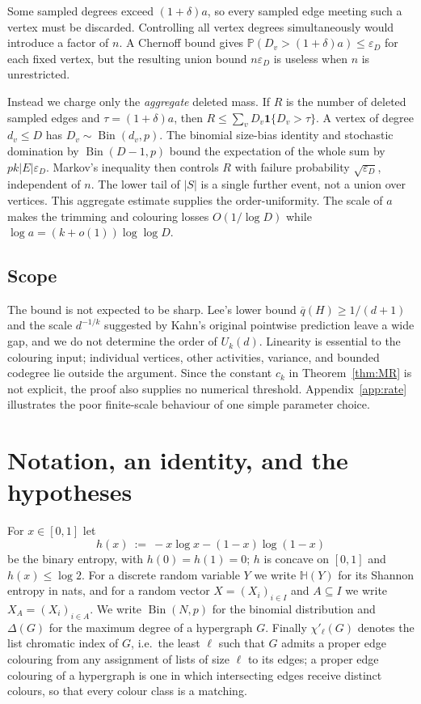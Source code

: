 \documentclass[11pt,a4paper]{amsart}
\theoremstyle{plain}
\theoremstyle{definition}
\theoremstyle{remark}
\newcommand{\EE}{E}
\newcommand{\PP}{\mathbb{P}}
\newcommand{\Ent}{\mathbb{H}}
\newcommand{\qbar}{\overline{q}}
\newcommand{\Bin}{\operatorname{Bin}}
\newcommand{\chil}{\chi'_{\ell}}
\newcommand{\Deltaop}{\Delta}
\begin{document}
Some sampled degrees exceed $(1+\delta)a$, so every sampled edge meeting such a vertex
must be discarded. Controlling all vertex degrees simultaneously would introduce a factor
of $n$. A Chernoff bound gives
$\PP(D_v>(1+\delta)a)\le\varepsilon_D$ for each fixed vertex, but the resulting union
bound $n\varepsilon_D$ is useless when $n$ is unrestricted.

Instead we charge only the \emph{aggregate} deleted mass. If $R$ is the number of deleted
sampled edges and $\tau=(1+\delta)a$, then
$R\le\sum_vD_v\mathbf1\{D_v>\tau\}$. A vertex of degree $d_v\le D$ has
$D_v\sim\Bin(d_v,p)$. The binomial size-bias identity and stochastic domination by
$\Bin(D-1,p)$ bound the expectation of the whole sum by
$pk|\EE|\varepsilon_D$. Markov's inequality then controls $R$ with failure probability
$\sqrt{\varepsilon_D}$, independent of $n$. The lower tail of $|S|$ is a single further
event, not a union over vertices. This aggregate estimate supplies the order-uniformity.
The scale of $a$ makes the trimming and colouring losses $O(1/\log D)$ while
$\log a=(k+o(1))\log\log D$.

\subsection{Scope}
\label{subsec:scope}

The bound is not expected to be sharp. Lee's lower bound $\qbar(H)\ge1/(d+1)$ and the
scale $d^{-1/k}$ suggested by Kahn's original pointwise prediction leave a wide gap, and
we do not determine the order of $U_k(d)$. Linearity is essential to the colouring input;
individual vertices, other activities, variance, and bounded codegree lie outside the
argument. Since the constant $c_k$ in Theorem~\ref{thm:MR} is not explicit, the proof also
supplies no numerical threshold. Appendix~\ref{app:rate} illustrates the poor finite-scale
behaviour of one simple parameter choice.

\section{Notation, an identity, and the hypotheses}
\label{sec:setup}

For $x\in[0,1]$ let
\[
  h(x)\ :=\ -x\log x-(1-x)\log(1-x)
\]
be the binary entropy, with $h(0)=h(1)=0$; $h$ is concave on $[0,1]$ and $h(x)\le\log2$.
For a discrete random variable $Y$ we write $\Ent(Y)$ for its Shannon entropy in nats, and
for a random vector $X=(X_i)_{i\in I}$ and $A\subseteq I$ we write $X_A=(X_i)_{i\in A}$. We
write $\Bin(N,p)$ for the binomial distribution and $\Deltaop(G)$ for the maximum degree of
a hypergraph $G$. Finally $\chil(G)$ denotes the list chromatic index of $G$, i.e.\ the
least $\ell$ such that $G$ admits a proper edge colouring from any assignment of lists of
size $\ell$ to its edges; a proper edge colouring of a hypergraph is one in which
intersecting edges receive distinct colours, so that every colour class is a matching.
\end{document}
